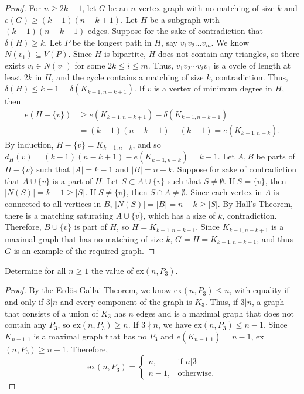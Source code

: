 \documentclass{article}
\newenvironment{problem}[2][Question]{\begin{trivlist}
\item[\hskip \labelsep {\bfseries #1}\hskip \labelsep {\bfseries #2.}]}{\end{trivlist}}
\begin{document}
\begin{proof}
    For $n \geq 2k + 1$, let $G$ be an $n$-vertex graph with no matching of size $k$ and $e(G) \geq (k-1)(n - k + 1)$. Let $H$ be a subgraph with $(k-1)(n - k + 1)$ edges. Suppose for the sake of contradiction that $\delta(H) \geq k$. Let $P$ be the longest path in $H$, say $v_1v_2\dots v_m$. We know $N(v_1) \subseteq V(P)$. Since $H$ is bipartite, $H$ does not contain any triangles, so there exists $v_i \in N(v_1)$ for some $2k \leq i \leq m$. Thus, $v_1v_2\cdots v_iv_1$ is a cycle of length at least $2k$ in $H$, and the cycle contains a matching of size $k$, contradiction. Thus, $\delta(H) \leq k - 1 = \delta(K_{k-1,n-k+1})$. If $v$ is a vertex of minimum degree in $H$, then 
    \begin{align}
        e(H - \{v\}) 
        &\geq e(K_{k-1,n-k+1}) - \delta(K_{k-1,n-k+1}) \\
        &= (k-1)(n-k+1) - (k-1) = e(K_{k-1,n-k}).
    \end{align}
    By induction, $H - \{v\} = K_{k-1,n-k}$, and so $d_H(v) = (k-1)(n - k + 1) - e(K_{k-1,n-k}) = k - 1$. Let $A,B$ be parts of $H - \{v\}$ such that $|A| = k - 1$ and $|B| = n - k$. Suppose for sake of contradiction that $A \cup \{v\}$ is a part of $H$. Let $S \subset A \cup \{v\}$ such that $S \neq \emptyset$. If $S = \{v\}$, then $|N(S)| = k - 1 \geq |S|$. If $S \neq \{v\}$, then $S \cap A \neq \emptyset$. Since each vertex in $A$ is connected to all vertices in $B$, $|N(S)| = |B| = n - k \geq |S|$. By Hall's Theorem, there is a matching saturating $A \cup \{v\}$, which has a size of $k$, contradiction. Therefore, $B \cup \{v\}$ is part of $H$, so $H = K_{k-1,n-k+1}$. Since $K_{k-1,n-k+1}$ is a maximal graph that has no matching of size $k$, $G = H = K_{k-1,n-k+1}$, and thus $G$ is an example of the required graph.
\end{proof}

\newpage

\begin{problem}{5.9.3}
     Determine for all $n \geq 1$ the value of ex$(n, P_3)$.
\end{problem}

\begin{proof}
    By the Erdös-Gallai Theorem, we know ex$(n, P_3) \leq n$, with equality if and only if $3|n$ and every component of the graph is $K_3$. Thus, if $3|n$, a graph that consists of a union of $K_3$ has $n$ edges and is a maximal graph that does not contain any $P_3$, so ex$(n, P_3) \geq n$. If $3 \nmid n$, we have ex$(n, P_3) \leq n - 1$. Since $K_{n-1,1}$ is a maximal graph that has no $P_3$ and $e(K_{n-1,1}) = n - 1$, ex$(n, P_3) \geq n - 1$. Therefore, \[
        \text{ex}(n,P_3)= \begin{cases}
        n,      & \text{if } n | 3 \\
        n - 1,  & \text{otherwise}.
        \end{cases}
    \]
\end{proof}
\end{document}
